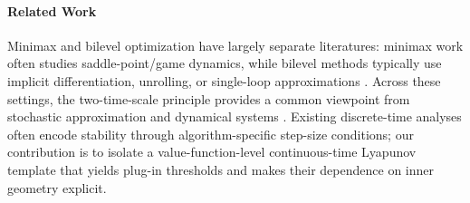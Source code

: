 \documentclass{article}
\newcommand{\1}{\mathbf{1}}
\begin{document}
\paragraph{Related Work}
Minimax and bilevel optimization have largely separate literatures: minimax work often studies saddle-point/game dynamics, while bilevel methods typically use implicit differentiation, unrolling, or single-loop approximations \cite{cherukuri2017saddle,ghadimi2018approximation,yang2021provably,hong2020two,khanduri2021near}. Across these settings, the two-time-scale principle provides a common viewpoint from stochastic approximation and dynamical systems \cite{borkar1997twotimescale,feijer2010pd,cherukuri2017saddle}. Existing discrete-time analyses often encode stability through algorithm-specific step-size conditions; our contribution is to isolate a value-function-level continuous-time Lyapunov template that yields plug-in thresholds and makes their dependence on inner geometry explicit.

\end{document}
